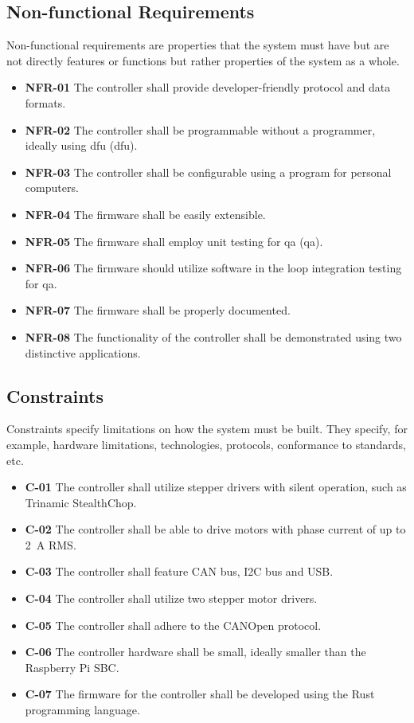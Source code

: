 \subsection{Non-functional Requirements}
\label{subsec:nonfunc_req}
Non-functional requirements are properties that the system must have but are not directly features or functions but rather properties of the system as a whole.

\begin{itemize}
    \item \textbf{NFR-01} The controller shall provide developer-friendly protocol and data formats.
    \item \textbf{NFR-02} The controller shall be programmable without a programmer, ideally using \acs{dfu} (\acl{dfu}).
    \item \textbf{NFR-03} The controller shall be configurable using a program for personal computers.
    \item \textbf{NFR-04} The firmware shall be easily extensible.
    \item \textbf{NFR-05} The firmware shall employ unit testing for \acs{qa} (\acl{qa}).
    \item \textbf{NFR-06} The firmware should utilize software in the loop integration testing for \acs{qa}.
    \item \textbf{NFR-07} The firmware shall be properly documented.
    \item \textbf{NFR-08} The functionality of the controller shall be demonstrated using two distinctive applications.
\end{itemize}

\subsection{Constraints}
\label{subsec:constraints}
Constraints specify limitations on how the system must be built.
They specify, for example, hardware limitations, technologies, protocols, conformance to standards, etc.

\begin{itemize}
    \item \textbf{C-01} The controller shall utilize stepper drivers with silent operation, such as Trinamic StealthChop\texttrademark.
    \item \textbf{C-02} The controller shall be able to drive motors with phase current of up to 2~A RMS.
    \item \textbf{C-03} The controller shall feature CAN bus, I2C bus and USB.
    \item \textbf{C-04} The controller shall utilize two stepper motor drivers.
    \item \textbf{C-05} The controller shall adhere to the CANOpen protocol.
    \item \textbf{C-06} The controller hardware shall be small, ideally smaller than the Raspberry Pi SBC.
    \item \textbf{C-07} The firmware for the controller shall be developed using the Rust programming language.
\end{itemize}
